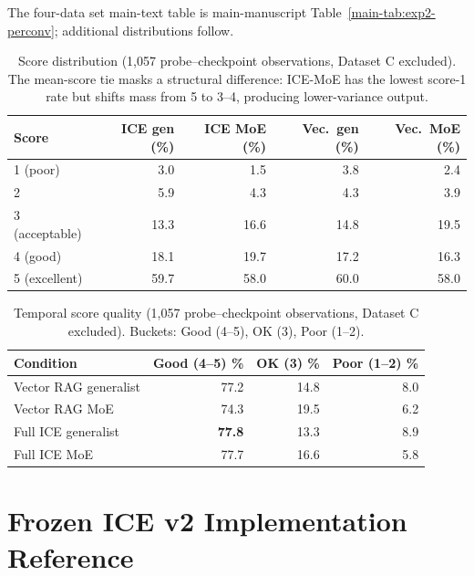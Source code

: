 \documentclass[twoside,11pt]{article}
\begin{document}
The four-data set main-text table is main-manuscript Table~\ref{main-tab:exp2-perconv}; additional distributions follow.

\begin{table}[tbp]
\centering
\small


\begin{tabular}{@{}lrrrr@{}}
\toprule
\textbf{Score} & \textbf{ICE gen (\%)} & \textbf{ICE MoE (\%)} & \textbf{Vec.\ gen (\%)} & \textbf{Vec.\ MoE (\%)} \\
\midrule
1 (poor)       & 3.0 & 1.5 & 3.8 & 2.4 \\
2              & 5.9 & 4.3 & 4.3 & 3.9 \\
3 (acceptable) & 13.3 & 16.6 & 14.8 & 19.5 \\
4 (good)       & 18.1 & 19.7 & 17.2 & 16.3 \\
5 (excellent)  & 59.7 & 58.0 & 60.0 & 58.0 \\
\bottomrule
\end{tabular}
\caption{Score distribution (1{,}057 probe--checkpoint observations, Dataset C excluded). The mean-score tie masks a structural difference: ICE-MoE has the lowest score-1 rate but shifts mass from 5 to 3--4, producing lower-variance output.}
\label{tab:exp2-score-dist}
\end{table}

\begin{table}[tbp]
\centering
\small


\begin{tabular}{@{}lrrr@{}}
\toprule
\textbf{Condition} & \textbf{Good (4--5) \%} & \textbf{OK (3) \%} & \textbf{Poor (1--2) \%} \\
\midrule
Vector RAG generalist  & 77.2 & 14.8 & 8.0 \\
Vector RAG MoE         & 74.3 & 19.5 & 6.2 \\
Full ICE generalist    & \textbf{77.8} & 13.3 & 8.9 \\
Full ICE MoE           & 77.7 & 16.6 & 5.8 \\
\bottomrule
\end{tabular}
\caption{Temporal score quality (1{,}057 probe--checkpoint observations, Dataset C excluded). Buckets: Good (4--5), OK (3), Poor (1--2).}
\label{tab:exp2-temporal}
\end{table}

\FloatBarrier
\section{Frozen ICE v2 Implementation Reference}
\label{app:implementation}
\end{document}
